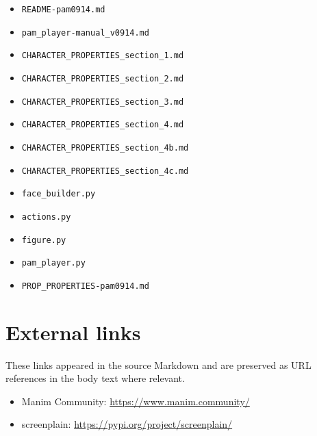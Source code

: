 \documentclass[
  11pt,
]{book}
\providecommand{\tightlist}{%
  \setlength{\itemsep}{0pt}\setlength{\parskip}{0pt}}
\begin{document}
\begin{itemize}
\tightlist
\item
  \texttt{README-pam0914.md}
\item
  \texttt{pam\_player-manual\_v0914.md}
\item
  \texttt{CHARACTER\_PROPERTIES\_section\_1.md}
\item
  \texttt{CHARACTER\_PROPERTIES\_section\_2.md}
\item
  \texttt{CHARACTER\_PROPERTIES\_section\_3.md}
\item
  \texttt{CHARACTER\_PROPERTIES\_section\_4.md}
\item
  \texttt{CHARACTER\_PROPERTIES\_section\_4b.md}
\item
  \texttt{CHARACTER\_PROPERTIES\_section\_4c.md}
\item
  \texttt{face\_builder.py}
\item
  \texttt{actions.py}
\item
  \texttt{figure.py}
\item
  \texttt{pam\_player.py}
\item
  \texttt{PROP\_PROPERTIES-pam0914.md}
\end{itemize}

\section{External links}\label{external-links}

These links appeared in the source Markdown and are preserved as URL
references in the body text where relevant.

\begin{itemize}
\tightlist
\item
  Manim Community: \url{https://www.manim.community/}
\item
  screenplain: \url{https://pypi.org/project/screenplain/}
\end{itemize}

\backmatter
\end{document}

